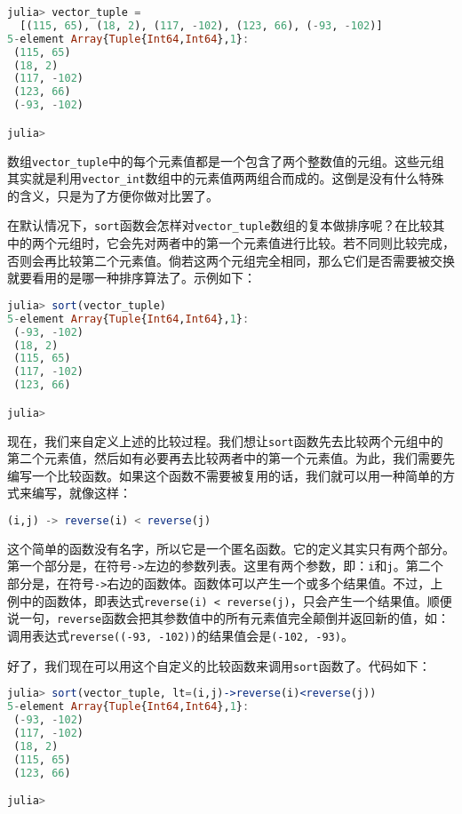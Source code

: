 \begin{lstlisting}[language=julia]
julia> vector_tuple = 
  [(115, 65), (18, 2), (117, -102), (123, 66), (-93, -102)]
5-element Array{Tuple{Int64,Int64},1}:
 (115, 65)  
 (18, 2)    
 (117, -102)
 (123, 66)  
 (-93, -102)

julia> 
\end{lstlisting}

数组\verb`vector_tuple`中的每个元素值都是一个包含了两个整数值的元组。这些元组其实就是利用\verb`vector_int`数组中的元素值两两组合而成的。这倒是没有什么特殊的含义，只是为了方便你做对比罢了。

在默认情况下，\verb`sort`函数会怎样对\verb`vector_tuple`数组的复本做排序呢？在比较其中的两个元组时，它会先对两者中的第一个元素值进行比较。若不同则比较完成，否则会再比较第二个元素值。倘若这两个元组完全相同，那么它们是否需要被交换就要看用的是哪一种排序算法了。示例如下：

\begin{lstlisting}[language=julia]
julia> sort(vector_tuple)
5-element Array{Tuple{Int64,Int64},1}:
 (-93, -102)
 (18, 2)    
 (115, 65)  
 (117, -102)
 (123, 66)  

julia> 
\end{lstlisting}

现在，我们来自定义上述的比较过程。我们想让\verb`sort`函数先去比较两个元组中的第二个元素值，然后如有必要再去比较两者中的第一个元素值。为此，我们需要先编写一个比较函数。如果这个函数不需要被复用的话，我们就可以用一种简单的方式来编写，就像这样：

\begin{lstlisting}[language=julia]
(i,j) -> reverse(i) < reverse(j)
\end{lstlisting}

这个简单的函数没有名字，所以它是一个匿名函数。它的定义其实只有两个部分。第一个部分是，在符号\verb`->`左边的参数列表。这里有两个参数，即：\verb`i`和\verb`j`。第二个部分是，在符号\verb`->`右边的函数体。函数体可以产生一个或多个结果值。不过，上例中的函数体，即表达式\verb`reverse(i) < reverse(j)`，只会产生一个结果值。顺便说一句，\verb`reverse`函数会把其参数值中的所有元素值完全颠倒并返回新的值，如：调用表达式\verb`reverse((-93, -102))`的结果值会是\verb`(-102, -93)`。

好了，我们现在可以用这个自定义的比较函数来调用\verb`sort`函数了。代码如下：

\begin{lstlisting}[language=julia]
julia> sort(vector_tuple, lt=(i,j)->reverse(i)<reverse(j))
5-element Array{Tuple{Int64,Int64},1}:
 (-93, -102)
 (117, -102)
 (18, 2)    
 (115, 65)  
 (123, 66)  

julia> 
\end{lstlisting}

